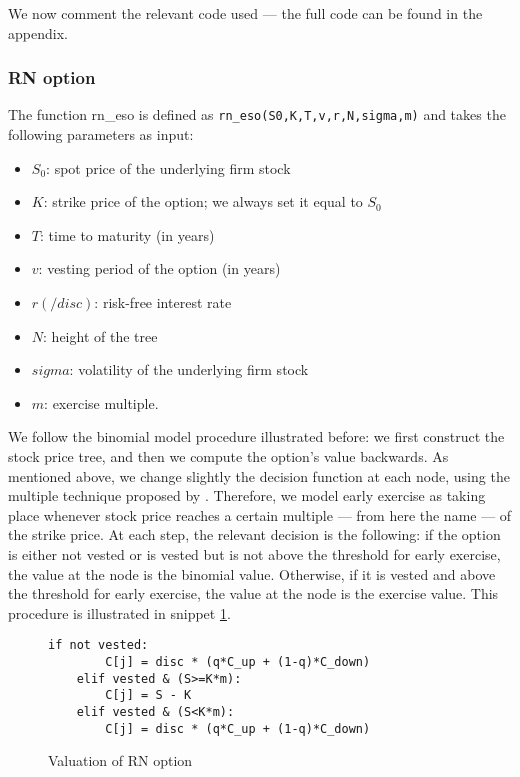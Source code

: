 We now comment the relevant code used --- the full code can be found in the appendix.

\subsubsection{RN option}
The function rn\_eso is defined as \verb|rn_eso(S0,K,T,v,r,N,sigma,m)| and takes the following parameters as input:
\begin{itemize}
    \item $S_0$: spot price of the underlying firm stock
    \item $K$: strike price of the option; we always set it equal to $S_0$ %
    \item $T$: time to maturity (in years)
    \item $v$: vesting period of the option (in years)
    \item $r (/disc)$: risk-free interest rate
    \item $N$: height of the tree
    \item $sigma$: volatility of the underlying firm stock
    \item $m$: exercise multiple.
\end{itemize}

    
We follow the binomial model procedure illustrated before: we first construct the stock price tree, and then we compute the option's value backwards. As mentioned above, we change slightly the decision function at each node, using the multiple technique proposed by \cite{hull2004value}. Therefore, we model early exercise as taking place whenever stock price reaches a certain multiple --- from here the name --- of the strike price.
At each step, the relevant decision is the following: if the option is either not vested or is vested but is not above the threshold for early exercise, the value at the node is the binomial value. Otherwise, if it is vested and above the threshold for early exercise, the value at the node is the exercise value. This procedure is illustrated in snippet \ref*{fig:val_rn}.

\begin{figure}[H]
    \begin{lstlisting}[breaklines, basicstyle=\ttfamily\small]
    if not vested: 
        C[j] = disc * (q*C_up + (1-q)*C_down)
    elif vested & (S>=K*m):            
        C[j] = S - K
    elif vested & (S<K*m):
        C[j] = disc * (q*C_up + (1-q)*C_down)
    \end{lstlisting}
    \caption{Valuation of RN option}
 \label{fig:val_rn}
\end{figure}

